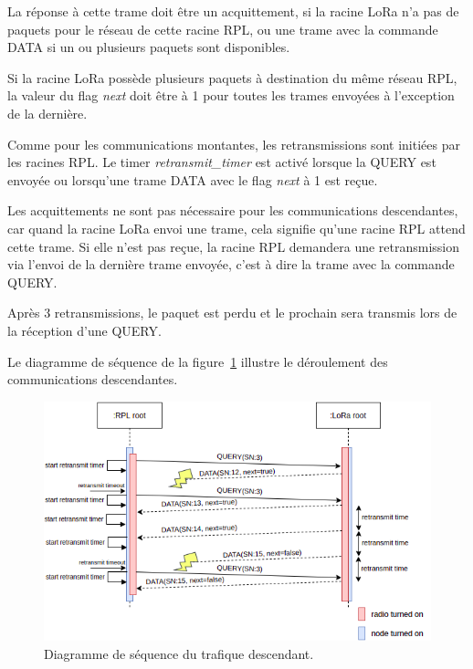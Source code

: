     La réponse à cette trame doit être un acquittement, si la racine LoRa n'a pas de paquets pour le réseau de cette racine RPL, ou une trame avec la commande DATA si un ou plusieurs paquets sont disponibles.

    Si la racine LoRa possède plusieurs paquets à destination du même réseau RPL, la valeur du flag \textit{next} doit être à 1 pour toutes les trames envoyées à l'exception de la dernière.

    Comme pour les communications montantes, les retransmissions sont initiées par les racines RPL.
    Le timer \textit{retransmit\_timer} est activé lorsque la QUERY est envoyée ou lorsqu'une trame DATA avec le flag \textit{next} à 1 est reçue.

    Les acquittements ne sont pas nécessaire pour les communications descendantes, car quand la racine LoRa envoi une trame, cela signifie qu'une racine RPL attend cette trame. Si elle n'est pas reçue, la racine RPL demandera une retransmission via l'envoi de la dernière trame envoyée, c'est à dire la trame avec la commande QUERY.

    Après 3 retransmissions, le paquet est perdu et le prochain sera transmis lors de la réception d'une QUERY.

    Le diagramme de séquence de la figure~\ref{fig:proto-seq-downward} illustre le déroulement des communications descendantes.
    \begin{figure}[H]
        \centering
        \includegraphics[scale=0.6]{res/pictures/loramac-sequence-DOWNWARD.drawio.png}
        \caption{Diagramme de séquence du trafique descendant.}
        \label{fig:proto-seq-downward}
    \end{figure}


